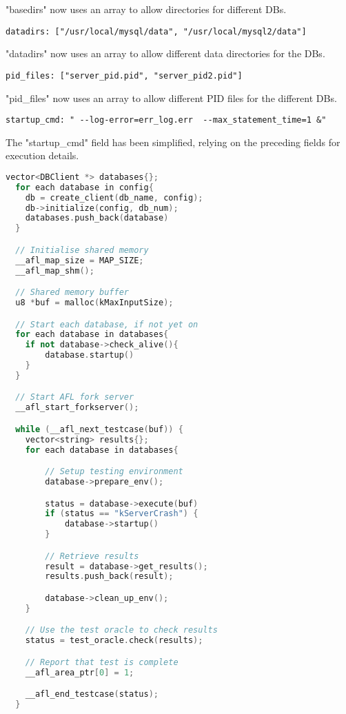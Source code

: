 \documentclass[sigconf]{acmart}
\begin{document}
"basedirs" now uses an array to allow directories for different DBs.

\begin{verbatim}
datadirs: ["/usr/local/mysql/data", "/usr/local/mysql2/data"]
\end{verbatim}

"datadirs" now uses an array to allow different data directories for the DBs.

\begin{verbatim}
pid_files: ["server_pid.pid", "server_pid2.pid"]
\end{verbatim}

"pid\_files" now uses an array to allow different PID files for the different DBs.

\begin{verbatim}
startup_cmd: " --log-error=err_log.err  --max_statement_time=1 &"
\end{verbatim}

The "startup\_cmd" field has been simplified, relying on the preceding fields for execution details.


\begin{lstlisting}[language=C++, caption={db\_driver.c Main Eventloop Pseudocode}, label={lst:dbdriver}]
  vector<DBClient *> databases{};
  for each database in config{
    db = create_client(db_name, config);
    db->initialize(config, db_num);
    databases.push_back(database)
  }

  // Initialise shared memory
  __afl_map_size = MAP_SIZE;
  __afl_map_shm();

  // Shared memory buffer
  u8 *buf = malloc(kMaxInputSize); 

  // Start each database, if not yet on
  for each database in databases{
    if not database->check_alive(){
        database.startup()
    }
  }

  // Start AFL fork server
  __afl_start_forkserver();

  while (__afl_next_testcase(buf)) {
    vector<string> results{};
    for each database in databases{

        // Setup testing environment
        database->prepare_env();

        status = database->execute(buf)
        if (status == "kServerCrash") {
            database->startup()
        }

        // Retrieve results
        result = database->get_results();
        results.push_back(result);

        database->clean_up_env();
    }

    // Use the test oracle to check results
    status = test_oracle.check(results);

    // Report that test is complete
    __afl_area_ptr[0] = 1;

    __afl_end_testcase(status);
  }
\end{lstlisting}
\end{document}
